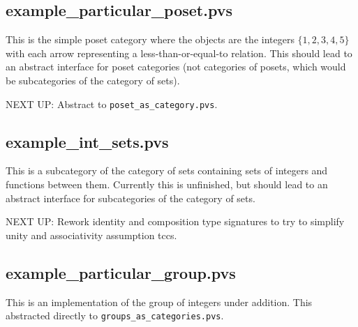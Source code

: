 \documentclass[11pt]{article}
\begin{document}
\subsection{example\_particular\_poset.pvs}

This is the simple poset category where the objects are the integers $\{1,2,3,4,5\}$ with each arrow representing a less-than-or-equal-to relation. This should lead to an abstract interface for poset categories (not categories of posets, which would be subcategories of the category of sets).

NEXT UP: Abstract to \texttt{poset\_as\_category.pvs}.

\subsection{example\_int\_sets.pvs}

This is a subcategory of the category of sets containing sets of integers and functions between them.  Currently this is unfinished, but should lead to an abstract interface for subcategories of the category of sets.

NEXT UP: Rework identity and composition type signatures to try to simplify unity and associativity assumption tccs.

\subsection{example\_particular\_group.pvs}

This is an implementation of the group of integers under addition. This abstracted directly to \texttt{groups\_as\_categories.pvs}.
\end{document}
